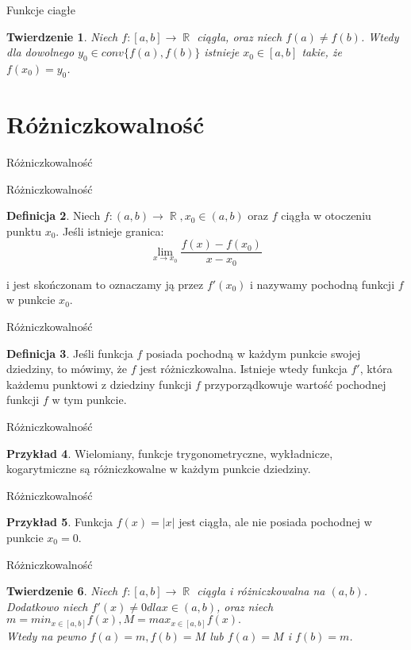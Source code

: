 \documentclass{beamer}
\newtheorem{tw}{Twierdzenie}[section]
\theoremstyle{definition}
\newtheorem{df}[tw]{Definicja}
\newtheorem{ex}[tw]{Przykład}
\DeclareMathOperator{\R}{\mathbb{R}}
\begin{document}
\begin{frame}{Funkcje ciagłe}
	\begin{tw}
		Niech $f:[a,b] \rightarrow \R$ ciągła, oraz niech $f(a) \neq f(b)$. Wtedy dla dowolnego $y_0 \in conv\{f(a),f(b)\}$ istnieje $x_0 \in [a,b]$ takie, że $f(x_0)=y_0$.
	\end{tw}
\end{frame}
\section{Różniczkowalność}

\begin{frame}{Różniczkowalność}

\end{frame}
\begin{frame}{Różniczkowalność}
	\begin{df}
		Niech $f:(a,b) \rightarrow \R, x_0 \in (a,b)$ oraz $f$ ciągła w otoczeniu punktu $x_0$. Jeśli istnieje granica:\\
		\begin{displaymath}
			\lim_{x \to x_0} \frac{f(x)-f(x_0)}{x-x_0}
		\end{displaymath}

i jest skończonam to oznaczamy ją przez $f'(x_0)$ i nazywamy pochodną funkcji $f$ w punkcie $x_0$.
	\end{df}
\end{frame}
\begin{frame}{Różniczkowalność}
	\begin{df}
		Jeśli funkcja $f$ posiada pochodną w każdym punkcie swojej dziedziny, to mówimy, że $f$ jest różniczkowalna. Istnieje wtedy funkcja $f'$, która każdemu punktowi z dziedziny funkcji $f$ przyporządkowuje wartość pochodnej funkcji $f$ w tym punkcie.
	\end{df}
\end{frame}
\begin{frame}{Różniczkowalność}
	\begin{ex}
		Wielomiany, funkcje trygonometryczne, wykładnicze, kogarytmiczne są różniczkowalne w każdym punkcie dziedziny.
	\end{ex}
\end{frame}
\begin{frame}{Różniczkowalność}
	\begin{ex}
		Funkcja $f(x)=|x|$ jest ciągła, ale nie posiada pochodnej w punkcie $x_0=0$.	
	\end{ex}
\end{frame}
\begin{frame}{Różniczkowalność}
	\begin{tw}
		Niech $f: [a,b] \rightarrow \R$ ciągła i różniczkowalna na $(a,b)$. Dodatkowo niech $f'(x) \neq 0 dla x\in (a,b)$, oraz niech $m=min_{x\in [a,b]} f(x), M=max_{x \in [a,b]}f(x).$\\
Wtedy na pewno $f(a)=m, f(b)=M$ lub $f(a)=M$ i $f(b)=m$.
	\end{tw}
\end{frame}
\end{document}
